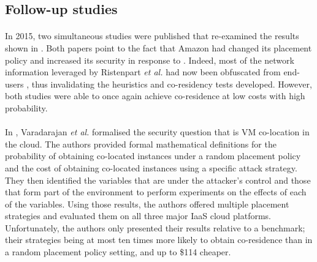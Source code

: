\documentclass[orivec,envcountsame, a4paper, 11pt]{llncs}
\begin{document}
\subsection{Follow-up studies}

\paragraph{} In 2015, two simultaneous studies were published \cite{Varadarajan2015,Xu2015} that re-examined the results shown in \cite{Ristenpart2009}. Both papers point to the fact that Amazon had changed its placement policy and increased its security in response to \cite{Ristenpart2009}. Indeed, most of the network information leveraged by Ristenpart \textit{et al.} had now been obfuscated from end-users \cite{Xu2015}, thus invalidating the heuristics and co-residency tests developed. However, both studies were able to once again achieve co-residence at low costs with high probability. 

\paragraph{} In \cite{Varadarajan2015}, Varadarajan \textit{et al.} formalised the security question that is VM co-location in the cloud. The authors provided formal mathematical definitions for the probability of obtaining co-located instances under a random placement policy and the cost of obtaining co-located instances using a specific attack strategy. They then identified the variables that are under the attacker's control and those that form part of the environment to perform experiments on the effects of each of the variables. Using those results, the authors offered multiple placement strategies and evaluated them on all three major IaaS cloud platforms. Unfortunately, the authors only presented their results relative to a benchmark; their strategies being at most ten times more likely to obtain co-residence than in a random placement policy setting, and up to \$114 cheaper.
\end{document}
